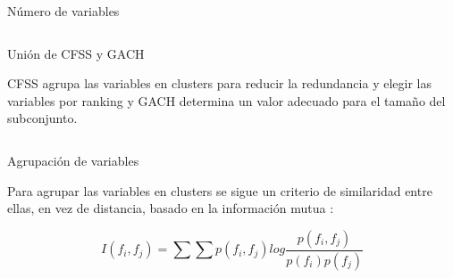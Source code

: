 \documentclass[final]{beamer}
\newlength{\onecolwid}
\newlength{\twocolwid}
\begin{document}
\begin{frame}[t]
\begin{columns}[t]
\begin{column}{\twocolwid}
\begin{columns}[t,totalwidth=\twocolwid]
\begin{column}{\onecolwid}
\begin{block}{Número de variables}
\end{block}


\end{column} %

\end{columns} %


\begin{alertblock}{Unión de CFSS y GACH}

CFSS agrupa las variables en clusters para reducir la redundancia y elegir las variables por ranking y GACH determina un valor adecuado para el tamaño del subconjunto.

\end{alertblock} 


\begin{columns}[t,totalwidth=\twocolwid] %

\begin{column}{\onecolwid} %


\begin{block}{Agrupación de variables}

Para agrupar las variables en clusters se sigue un criterio de similaridad entre ellas, en vez de distancia, basado en la información mutua \cite{cover1991}:
  
\begin{equation}
I(f_{i},f_{j}) = \sum \sum p(f_{i},f_{j}) log \frac{p(f_{i},f_{j})}{p(f_{i})p(f_{j})}
\label{eqn:MI}
\end{equation}


\end{block}
\end{column}
\end{columns}
\end{column}
\end{columns}
\end{frame}
\end{document}
